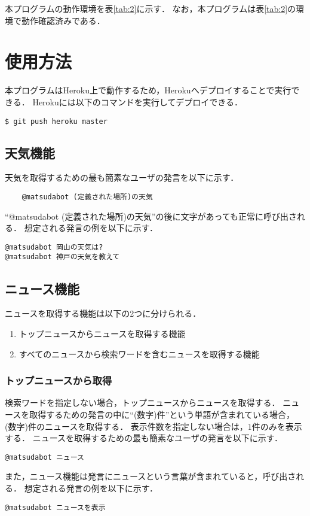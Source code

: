 \documentclass[12pt]{jsarticle}
\begin{document}
本プログラムの動作環境を表\ref{tab:2}に示す．
なお，本プログラムは表\ref{tab:2}の環境で動作確認済みである．
\section{使用方法}
本プログラムはHeroku上で動作するため，Herokuへデプロイすることで実行できる．
Herokuには以下のコマンドを実行してデプロイできる．
\begin{verbatim}
$ git push heroku master
\end{verbatim}

\subsection{天気機能}
天気を取得するための最も簡素なユーザの発言を以下に示す．
\begin{verbatim}
	@matsudabot (定義された場所)の天気
\end{verbatim}
``@matsudabot (定義された場所)の天気''の後に文字があっても正常に呼び出される．
想定される発言の例を以下に示す．
\begin{verbatim}
@matsudabot 岡山の天気は?
@matsudabot 神戸の天気を教えて
\end{verbatim}

\subsection{ニュース機能}
ニュースを取得する機能は以下の2つに分けられる．
\begin{enumerate}
\item トップニュースからニュースを取得する機能
\item すべてのニュースから検索ワードを含むニュースを取得する機能
\end{enumerate}
\subsubsection{トップニュースから取得}
検索ワードを指定しない場合，トップニュースからニュースを取得する．
ニュースを取得するための発言の中に``(数字)件''という単語が含まれている場合，(数字)件のニュースを取得する．
表示件数を指定しない場合は，$1$件のみを表示する．
ニュースを取得するための最も簡素なユーザの発言を以下に示す．
\begin{verbatim}
@matsudabot ニュース
\end{verbatim}
また，ニュース機能は発言にニュースという言葉が含まれていると，呼び出される．
想定される発言の例を以下に示す．
\begin{verbatim}
@matsudabot ニュースを表示
\end{verbatim}
\end{document}
